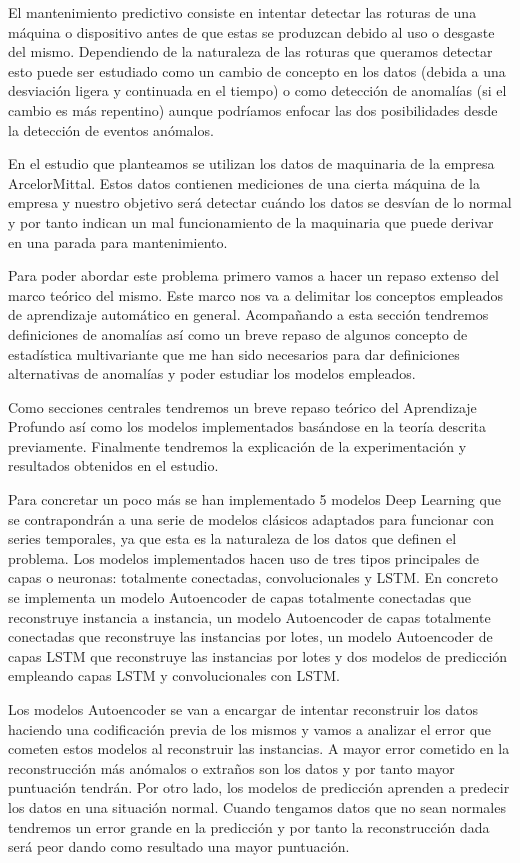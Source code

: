 El mantenimiento predictivo consiste en intentar detectar las roturas de una máquina o dispositivo antes de que estas se produzcan debido al uso o desgaste del mismo. Dependiendo de la naturaleza de las roturas que queramos detectar esto puede ser estudiado como un cambio de concepto en los datos (debida a una desviación ligera y continuada en el tiempo) o como detección de anomalías (si el cambio es más repentino) aunque podríamos enfocar las dos posibilidades desde la detección de eventos anómalos.

En el estudio que planteamos se utilizan los datos de maquinaria de la empresa ArcelorMittal. Estos datos contienen mediciones de una cierta máquina de la empresa y nuestro objetivo será detectar cuándo los datos se desvían de lo normal y por tanto indican un mal funcionamiento de la maquinaria que puede derivar en una parada para mantenimiento. 

Para poder abordar este problema primero vamos a hacer un repaso extenso del marco teórico del mismo. Este marco nos va a delimitar los conceptos empleados de aprendizaje automático en general. Acompañando a esta sección tendremos definiciones de anomalías así como un breve repaso de algunos concepto de estadística multivariante que me han sido necesarios para dar definiciones alternativas de anomalías y poder estudiar los modelos empleados.

Como secciones centrales tendremos un breve repaso teórico del Aprendizaje Profundo así como los modelos implementados basándose en la teoría descrita previamente. Finalmente tendremos la explicación de la experimentación y resultados obtenidos en el estudio.

Para concretar un poco más se han implementado 5 modelos Deep Learning que se contrapondrán a una serie de modelos clásicos adaptados para funcionar con series temporales, ya que esta es la naturaleza de los datos que definen el problema. Los modelos implementados hacen uso de tres tipos principales de capas o neuronas: totalmente conectadas, convolucionales y LSTM. En concreto se implementa un modelo Autoencoder de capas totalmente conectadas que reconstruye instancia a instancia, un modelo Autoencoder de capas totalmente conectadas que reconstruye las instancias por lotes, un modelo Autoencoder de capas LSTM que reconstruye las instancias por lotes y dos modelos de predicción empleando capas LSTM y convolucionales con LSTM.

Los modelos Autoencoder se van a encargar de intentar reconstruir los datos haciendo una codificación previa de los mismos y vamos a analizar el error que cometen estos modelos al reconstruir las instancias. A mayor error cometido en la reconstrucción más anómalos o extraños son los datos y por tanto mayor puntuación tendrán. Por otro lado, los modelos de predicción aprenden a predecir los datos en una situación normal. Cuando tengamos datos que no sean normales tendremos un error grande en la predicción y por tanto la reconstrucción dada será peor dando como resultado una mayor puntuación.

